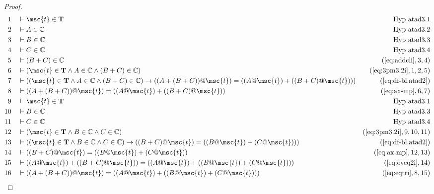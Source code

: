 \begin{proof}
\begin{align}
  1 &&  & \vdash \msc{t} \in \mathbf{T}&\text{Hyp~atad3.1}\notag%
  \\ 2 &&  & \vdash A \in \mathbb{C}&\text{Hyp~atad3.2}\notag%
  \\ 3 &&  & \vdash B \in \mathbb{C}&\text{Hyp~atad3.3}\notag%
  \\ 4 &&  & \vdash C \in \mathbb{C}&\text{Hyp~atad3.4}\notag%
  \\ 5 &&  & \vdash ( B + C ) \in \mathbb{C}&(\mbox{\ref{eq:addcli}},3,4)\notag
  \\ 6 &&  & \vdash ( \msc{t} \in \mathbf{T} \wedge A \in \mathbb{C} \wedge ( B + C ) \in \mathbb{C} )&(\mbox{\ref{eq:3pm3.2i}},1,2,5)\notag
  \\ 7 &&  & \vdash ( ( \msc{t} \in \mathbf{T} \wedge A \in \mathbb{C} \wedge ( B + C ) \in \mathbb{C} ) \rightarrow ( ( A + ( B + C ) ) @ \msc{t} ) = ( ( A @ \msc{t} ) + ( ( B + C ) @ \msc{t} ) ) )&(\mbox{\ref{eq:df-bl.atad2}})\notag
  \\ 8 &&  & \vdash ( ( A + ( B + C ) ) @ \msc{t} ) = ( ( A @ \msc{t} ) + ( ( B + C ) @ \msc{t} ) )&(\mbox{\ref{eq:ax-mp}},6,7)\notag
  \\ 9 &&  & \vdash \msc{t} \in \mathbf{T}&\text{Hyp~atad3.1}\notag%
  \\ 10 &&  & \vdash B \in \mathbb{C}&\text{Hyp~atad3.3}\notag%
  \\ 11 &&  & \vdash C \in \mathbb{C}&\text{Hyp~atad3.4}\notag%
  \\ 12 &&  & \vdash ( \msc{t} \in \mathbf{T} \wedge B \in \mathbb{C} \wedge C \in \mathbb{C} )&(\mbox{\ref{eq:3pm3.2i}},9,10,11)\notag
  \\ 13 &&  & \vdash ( ( \msc{t} \in \mathbf{T} \wedge B \in \mathbb{C} \wedge C \in \mathbb{C} ) \rightarrow ( ( B + C ) @ \msc{t} ) = ( ( B @ \msc{t} ) + ( C @ \msc{t} ) ) )&(\mbox{\ref{eq:df-bl.atad2}})\notag
  \\ 14 &&  & \vdash ( ( B + C ) @ \msc{t} ) = ( ( B @ \msc{t} ) + ( C @ \msc{t} ) )&(\mbox{\ref{eq:ax-mp}},12,13)\notag
  \\ 15 &&  & \vdash ( ( A @ \msc{t} ) + ( ( B + C ) @ \msc{t} ) ) = ( ( A @ \msc{t} ) + ( ( B @ \msc{t} ) + ( C @ \msc{t} ) ) )&(\mbox{\ref{eq:oveq2i}},14)\notag
  \\ 16 &&  & \vdash ( ( A + ( B + C ) ) @ \msc{t} ) = ( ( A @ \msc{t} ) + ( ( B @ \msc{t} ) + ( C @ \msc{t} ) ) )&(\mbox{\ref{eq:eqtri}},8,15)\notag
\end{align}
\end{proof}

